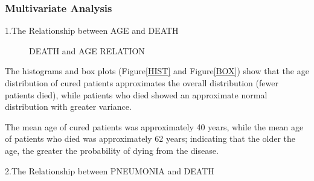 \documentclass[
  journal=medium,
  manuscript=Report,
  year=2023,
  volume=37,
]{cup-journal}
\begin{document}
\subsubsection{Multivariate Analysis}

1.The Relationship between AGE and DEATH

\begin{figure}[htbp]
    \centering
    \hfill
    \caption{DEATH and AGE RELATION}
    \label{combine1}
\end{figure}

The histograms and box plots (Figure\ref{HIST} and Figure\ref{BOX}) show that the age distribution of cured patients approximates the overall distribution (fewer patients died), while patients who died showed an approximate normal distribution with greater variance.

The mean age of cured patients was approximately 40 years, while the mean age of patients who died was approximately 62 years; indicating that the older the age, the greater the probability of dying from the disease.

\newpage
2.The Relationship between PNEUMONIA and DEATH
\end{document}
